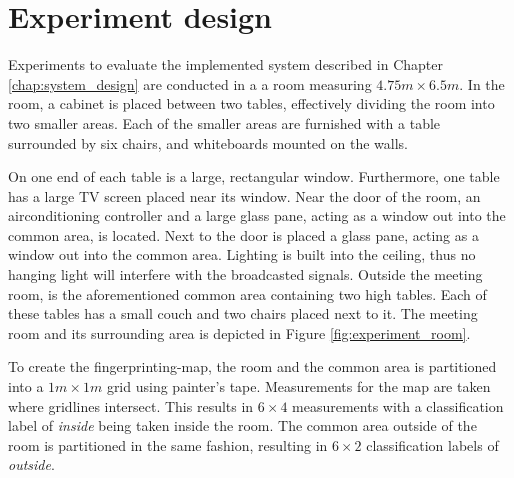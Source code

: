 \section{Experiment design}\label{sec:experiment_design}
Experiments to evaluate the implemented system described in Chapter \ref{chap:system_design} are conducted in a a room measuring $4.75m \times 6.5m$.
In the room, a cabinet is placed between two tables, effectively dividing the room into two smaller areas. 
Each of the smaller areas are furnished with a table surrounded by six chairs, and whiteboards mounted on the walls.

On one end of each table is a large, rectangular window.
Furthermore, one table has a large TV screen placed near its window. 
Near the door of the room, an airconditioning controller and a large glass pane, acting as a window out into the common area, is located. 
Next to the door is placed a glass pane, acting as a window out into the common area. 
Lighting is built into the ceiling, thus no hanging light will interfere with the broadcasted signals. 
Outside the meeting room, is the aforementioned common area containing two high tables.
Each of these tables has a small couch and two chairs placed next to it.
The meeting room and its surrounding area is depicted in Figure \ref{fig:experiment_room}.

To create the fingerprinting-map, the room and the common area is partitioned into a $1m \times 1m$ grid using painter's tape.
Measurements for the map are taken where gridlines intersect.
This results in $6 \times 4$ measurements with a classification label of \textit{inside} being taken inside the room.
The common area outside of the room is partitioned in the same fashion, resulting in  $6 \times 2$ classification labels of \textit{outside}. 


